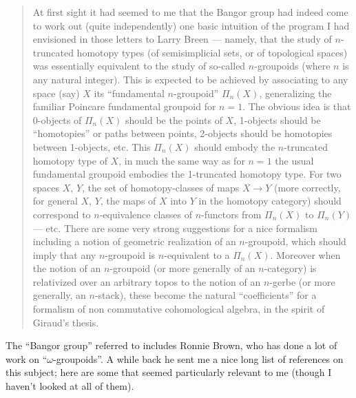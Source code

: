 \documentclass{article}
\begin{document}
\begin{quote}
At first sight it had seemed to me that the Bangor group had indeed come
to work out (quite independently) one basic intuition of the program I
had envisioned in those letters to Larry Breen --- namely, that the
study of \(n\)-truncated homotopy types (of semisimplicial sets, or of
topological spaces) was essentially equivalent to the study of so-called
\(n\)-groupoids (where \(n\) is any natural integer). This is expected
to be achieved by associating to any space (say) \(X\) its ``fundamental
\(n\)-groupoid'' \(\Pi_n(X)\), generalizing the familiar Poincare
fundamental groupoid for \(n = 1\). The obvious idea is that 0-objects
of \(\Pi_n(X)\) should be the points of \(X\), 1-objects should be
``homotopies'' or paths between points, 2-objects should be homotopies
between 1-objects, etc. This \(\Pi_n(X)\) should embody the
\(n\)-truncated homotopy type of \(X\), in much the same way as for
\(n = 1\) the usual fundamental groupoid embodies the 1-truncated
homotopy type. For two spaces \(X\), \(Y\), the set of homotopy-classes
of maps \(X \to Y\) (more correctly, for general \(X\), \(Y\), the maps
of \(X\) into \(Y\) in the homotopy category) should correspond to
\(n\)-equivalence classes of \(n\)-functors from \(\Pi_n(X)\) to
\(\Pi_n(Y)\) --- etc. There are some very strong suggestions for a nice
formalism including a notion of geometric realization of an
\(n\)-groupoid, which should imply that any \(n\)-groupoid is
\(n\)-equivalent to a \(\Pi_n(X)\). Moreover when the notion of an
\(n\)-groupoid (or more generally of an \(n\)-category) is relativized
over an arbitrary topos to the notion of an \(n\)-gerbe (or more
generally, an \(n\)-stack), these become the natural ``coefficients''
for a formalism of non commutative cohomological algebra, in the spirit
of Giraud's thesis.
\end{quote}

The ``Bangor group'' referred to includes Ronnie Brown, who has done a
lot of work on ``\(\omega\)-groupoids''. A while back he sent me a nice
long list of references on this subject; here are some that seemed
particularly relevant to me (though I haven't looked at all of them).
\end{document}
